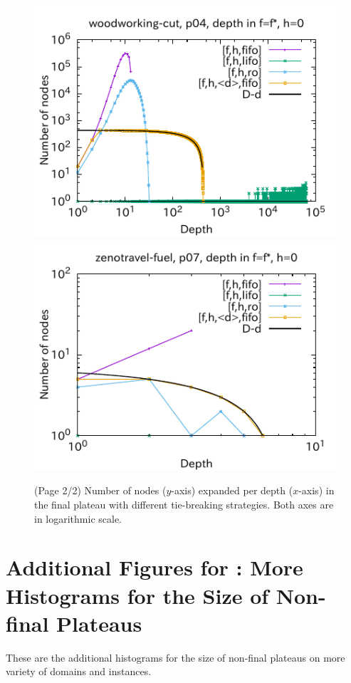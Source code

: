 \begin{figure}[htb]
\includegraphics[width=0.4\linewidth]{img/output-lmcut/woodworking-cut/p04-0.pdf}
\includegraphics[width=0.4\linewidth]{img/output-lmcut/zenotravel-fuel/p07-0.pdf}
 \caption{(Page 2/2) Number of nodes ($y$-axis) expanded per depth ($x$-axis) in
 the final plateau with different tie-breaking strategies. Both axes are in logarithmic scale.
 }
 \label{fig:depth-histogram3}
\end{figure}

\clearpage
\section[Additional Figures for \refig{fig:depth-histogram4}]{Additional Figures for : More Histograms for the Size of Non-final Plateaus}

These are the additional histograms for the size of non-final plateaus on
more variety of domains and instances.


